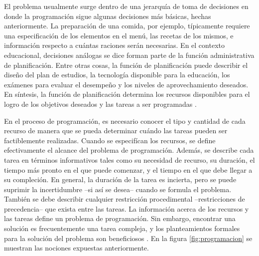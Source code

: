 \documentclass[draft,12pt,headsepline,footsepline,paper=letter]{scrreprt}
\begin{document}
El problema usualmente surge dentro de una jerarquía de toma de decisiones en donde la programación sigue algunas decisiones más básicas, hechas anteriormente. La preparación de una comida, por ejemplo, típicamente requiere una especificación de los elementos en el menú, las recetas de los mismos, e información respecto a cuántas raciones serán necesarias. En el contexto educacional, decisiones análogas se dice forman parte de la función administrativa de planificación. Entre otras cosas, la función de planificación puede describir el diseño del plan de estudios, la tecnología disponible para la educación, los exámenes para evaluar el desempeño y los niveles de aprovechamiento deseados. En síntesis, la función de planificación determina los recursos disponibles para el logro de los objetivos deseados y las tareas a ser programadas \citep[p.~2]{Baker2009}.

En el proceso de programación, es necesario conocer el tipo y cantidad de cada recurso de manera que se pueda determinar cuándo las tareas pueden ser factiblemente realizadas. Cuando se especifícan los recursos, se define efectivamente el alcance del problema de programación. Además, se describe cada tarea en términos informativos tales como su necesidad de recurso, su duración, el tiempo más pronto en el que puede comenzar, y el tiempo en el que debe llegar a su compleción. En general, la duración de la tarea es incierta, pero se puede suprimir la incertidumbre –si así se desea– cuando se formula el problema. También se debe describir cualquier restricción procedimental –restricciones de precedencia– que exista entre las tareas. La información acerca de los recursos y las tareas define un problema de programación. Sin embargo, encontrar una solución es frecuentemente una tarea compleja, y los planteamientos formales para la solución del problema son beneficiosos \citep[p.~2]{Baker2009}. En la figura \ref{fig:programacion} se muestran las nociones expuestas anteriormente.
\end{document}
